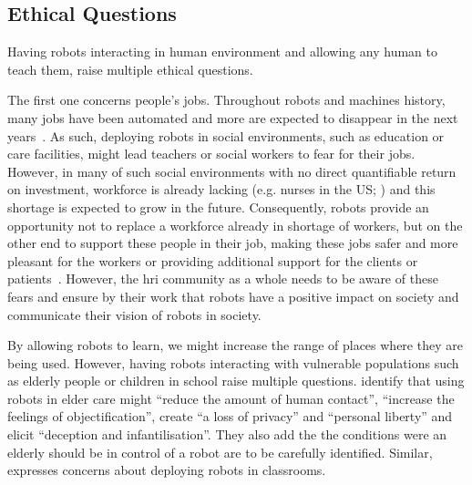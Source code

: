 \subsection{Ethical Questions} \label{sec:disc_ethics}
Having robots interacting in human environment and allowing any human to teach them, raise multiple ethical questions.

The first one concerns people's jobs. Throughout robots and machines history, many jobs have been automated and more are expected to disappear in the next years~\citep{frey2017future}. As such, deploying robots in social environments, such as education or care facilities, might lead teachers or social workers to fear for their jobs. However, in many of such social environments with no direct quantifiable return on investment, workforce is already lacking (e.g. nurses in the US; \citealt{nevidjon2001nursing}) and this shortage is expected to grow in the future. Consequently, robots provide an opportunity not to replace a workforce already in shortage of workers, but on the other end to support these people in their job, making these jobs safer and more pleasant for the workers or providing additional support for the clients or patients~\citep{wada2005psychological}. However, the \gls{hri} community as a whole needs to be aware of these fears and ensure by their work that robots have a positive impact on society and communicate their vision of robots in society.

By allowing robots to learn, we might increase the range of places where they are being used. However, having robots interacting with vulnerable populations such as elderly people or children in school raise multiple questions. \cite{sharkey2012granny} identify that using robots in elder care might ``reduce the amount of human contact'', ``increase the feelings of objectification'', create ``a loss of privacy'' and ``personal liberty'' and elicit ``deception and infantilisation''. They also add the the conditions were an elderly should be in control of a robot are to be carefully identified. Similar, \cite{sharkey2016should} expresses concerns about deploying robots in classrooms.

